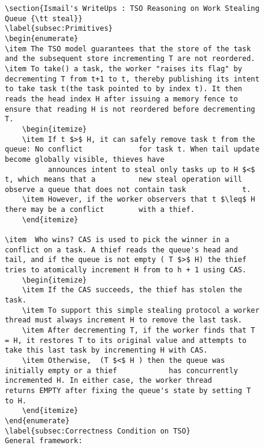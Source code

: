 \documentclass[a4paper]{article}
\begin{document}
{\begin{figure}
\begin{lstlisting}
\section{Ismail's WriteUps : TSO Reasoning on Work Stealing Queue {\tt steal}}
\label{subsec:Primitives}
\begin{enumerate}
\item The TSO model guarantees that the store of the task and the subsequent store incrementing T are not reordered. 
\item To take() a task, the worker "raises its flag" by decrementing T from t+1 to t, thereby publishing its intent to take task t(the task pointed to by index t). It then reads the head index H after issuing a memory fence to ensure that reading H is not reordered before decrementing T.
	\begin{itemize}
	\item If t $>$ H, it can safely remove task t from the queue: No conflict 			  for task t. When tail update become globally visible, thieves have 	
		  announces intent to steal only tasks up to H $<$ t, which means that a 		  new steal operation will observe a queue that does not contain task 			  t.
	\item However, if the worker observers that t $\leq$ H there may be a conflict 		  with a thief.
	\end{itemize}
	
\item  Who wins? CAS is used to pick the winner in a conflict on a task. A thief reads the queue's head and tail, and if the queue is not empty ( T $>$ H) the thief tries to atomically increment H from to h + 1 using CAS. 
	\begin{itemize}
	\item If the CAS succeeds, the thief has stolen the task.
	\item To support this simple stealing protocol a worker thread must always increment H to remove the last task.
	\item After decrementing T, if the worker finds that T = H, it restores T to its original value and attempts to take this last task by incrementing H with CAS.
	\item Otherwise,  (T $<$ H ) then the queue was initially empty or a thief 			  has concurrently incremented H. In either case, the worker thread 			  returns EMPTY after fixing the queue's state by setting T to H. 
	\end{itemize}
\end{enumerate}
\label{subsec:Correctness Condition on TSO}
General framework:


\end{lstlisting}
\end{figure}}
\end{document}
